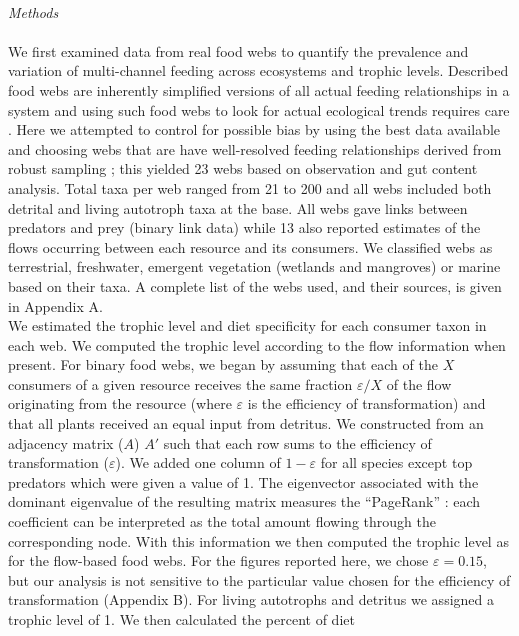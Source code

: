 \documentclass[12pt,a4paper,oneside]{article}
\begin{document}
\\
\emph{Methods}\\
\\
\indent We first examined data from real food webs to quantify the prevalence and
variation of multi-channel feeding across ecosystems and trophic levels.
Described food webs are inherently simplified versions of all actual
feeding relationships in a system and using such food webs to look for
actual ecological trends requires care \citep{Dunne:2004,
  Martinez:1991}. Here we attempted to control for possible bias by using the
best data available and choosing webs that are have well-resolved feeding relationships derived from robust sampling \citep{Martinez:1999}; this yielded
23 webs based on observation and gut content analysis. Total taxa per
web ranged from 21 to 200 and all webs included both detrital and
living autotroph taxa at the base. All webs gave links between
predators and prey (binary link data) while 13 also reported estimates
of the flows occurring between each resource and its
consumers. We classified webs as terrestrial, freshwater, emergent
vegetation (wetlands and mangroves)
or marine based on their taxa. A complete list of the webs used, and
their sources, is given in Appendix A.
\\
\indent We estimated the trophic level
and diet specificity for each consumer taxon in each web. We computed the trophic
level according to the flow
information \citep{Levine:1980} when present. For binary food webs,
we began by assuming that each of the \(X\) consumers of a given resource receives the same fraction
\(\varepsilon/X\) of the flow originating from the resource (where \(\varepsilon\) is the efficiency of transformation) and that all plants received an equal input from detritus. We constructed from an adjacency matrix (\(A\)) \(A'\) such that each row sums to the efficiency of transformation (\(\varepsilon\)). We added one column of \(1-\varepsilon\) for all species except top predators which were given a value of 1. The eigenvector associated with the dominant eigenvalue of the resulting matrix measures the ``PageRank'' \citep{Allesina:2009}: each coefficient can be interpreted as the total amount flowing through the corresponding node. With this information we then computed the trophic level as for the
flow-based food webs. For the figures reported here, we chose
\(\varepsilon=0.15\), but our analysis is not sensitive to the
particular value chosen for the efficiency of transformation (Appendix
B). For living autotrophs and detritus we
assigned a trophic level of 1. We then calculated the percent of diet
\end{document}

